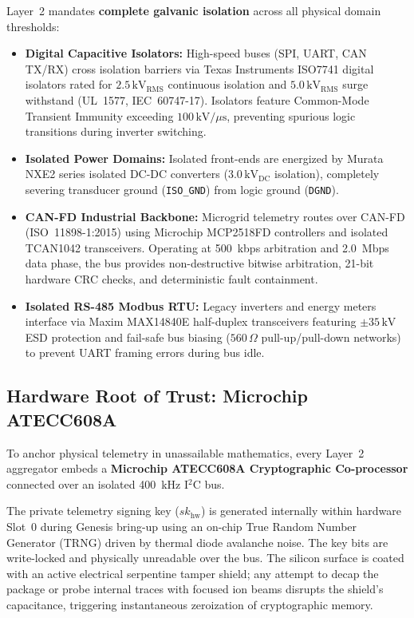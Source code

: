 Layer~2 mandates \textbf{complete galvanic isolation} across all physical domain thresholds:
\begin{itemize}
    \item \textbf{Digital Capacitive Isolators:} High-speed buses (SPI, UART, CAN TX/RX) cross isolation barriers via Texas Instruments ISO7741 digital isolators rated for $2.5\,\mathrm{kV}_{\mathrm{RMS}}$ continuous isolation and $5.0\,\mathrm{kV}_{\mathrm{RMS}}$ surge withstand (UL~1577, IEC~60747-17). Isolators feature Common-Mode Transient Immunity exceeding $100\,\mathrm{kV}/\mu\mathrm{s}$, preventing spurious logic transitions during inverter switching.
    \item \textbf{Isolated Power Domains:} Isolated front-ends are energized by Murata NXE2 series isolated DC-DC converters ($3.0\,\mathrm{kV}_{\mathrm{DC}}$ isolation), completely severing transducer ground (\texttt{ISO\_GND}) from logic ground (\texttt{DGND}).
    \item \textbf{CAN-FD Industrial Backbone:} Microgrid telemetry routes over CAN-FD (ISO~11898-1:2015) \parencite{iso11898_2015} using Microchip MCP2518FD controllers and isolated TCAN1042 transceivers. Operating at 500~kbps arbitration and 2.0~Mbps data phase, the bus provides non-destructive bitwise arbitration, 21-bit hardware CRC checks, and deterministic fault containment.
    \item \textbf{Isolated RS-485 Modbus RTU:} Legacy inverters and energy meters interface via Maxim MAX14840E half-duplex transceivers featuring $\pm 35\,\mathrm{kV}$ ESD protection and fail-safe bus biasing ($560\,\Omega$ pull-up/pull-down networks) to prevent UART framing errors during bus idle.
\end{itemize}

\subsection{Hardware Root of Trust: Microchip ATECC608A}

To anchor physical telemetry in unassailable mathematics, every Layer~2 aggregator embeds a \textbf{Microchip ATECC608A Cryptographic Co-processor} \parencite{microchip_atecc608a} connected over an isolated 400~kHz I$^2$C bus.

The private telemetry signing key ($sk_{\mathrm{hw}}$) is generated internally within hardware Slot~0 during Genesis bring-up using an on-chip True Random Number Generator (TRNG) driven by thermal diode avalanche noise. The key bits are write-locked and physically unreadable over the bus. The silicon surface is coated with an active electrical serpentine tamper shield; any attempt to decap the package or probe internal traces with focused ion beams disrupts the shield's capacitance, triggering instantaneous zeroization of cryptographic memory.

